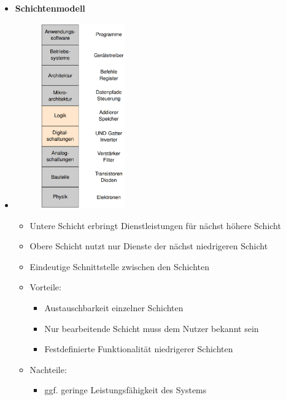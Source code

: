 \documentclass[11pt,a4paper]{article}
\begin{document}
\begin{itemize}
\item \textbf{Schichtenmodell}
\item[] 
	\begin{minipage}{0.225\textwidth}
		\begin{figure}[H]
		\includegraphics[height=8cm]{Bilder/schichtenmodell}
		\end{figure}
	\end{minipage}
	\begin{minipage}[t]{0.7\textwidth}
		\vspace{-3.5cm}
		\begin{itemize}
		\item Untere Schicht erbringt Dienstleistungen für nächst höhere Schicht
		\item Obere Schicht nutzt nur Dienste der nächst niedrigeren Schicht
		\item Eindeutige Schnittstelle zwischen den Schichten
		\item Vorteile: 
			\begin{itemize}
			\item Austauschbarkeit einzelner Schichten
			\item Nur bearbeitende Schicht muss dem Nutzer bekannt sein
			\item Festdefinierte Funktionalität niedrigerer Schichten
			\end{itemize}
		\item Nachteile:
			\begin{itemize}
			\item ggf. geringe Leistungsfähigkeit des Systems
			\end{itemize}
		\end{itemize}
	\end{minipage}

\vspace{0.4cm}


\end{itemize}
\end{document}
